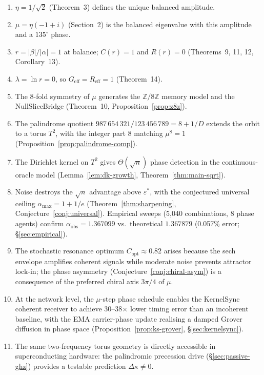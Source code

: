 \documentclass[12pt,a4paper]{article}
\theoremstyle{plain}
\theoremstyle{definition}
\theoremstyle{remark}
\newcommand{\Z}{\mathbb{Z}}
\newcommand{\abs}[1]{\lvert #1 \rvert}
\newcommand{\Geff}{G_{\mathrm{eff}}}
\newcommand{\Reff}{R_{\mathrm{eff}}}
\begin{document}
\begin{enumerate}
  \item $\eta = 1/\sqrt{2}$ (Theorem~3) defines the unique balanced amplitude.
  \item $\mu = \eta(-1+i)$ (Section~2) is the balanced eigenvalue with this
    amplitude and a $135^\circ$ phase.
  \item $r = \abs{\beta}/\abs{\alpha} = 1$ at balance; $C(r) = 1$ and $R(r)=0$
    (Theorems~9, 11, 12, Corollary~13).
  \item $\lambda = \ln r = 0$, so $\Geff=\Reff=1$ (Theorem~14).
  \item The 8-fold symmetry of $\mu$ generates the $\Z/8\Z$ memory model and
    the NullSliceBridge (Theorem~10, Proposition~\ref{prop:z8z}).
  \item The palindrome quotient $987\,654\,321/123\,456\,789 = 8 + 1/D$
    extends the orbit to a torus $T^2$, with the integer part $8$ matching
    $\mu^8=1$ (Proposition~\ref{prop:palindrome-comp}).
  \item The Dirichlet kernel on $T^2$ gives $\Theta(\sqrt{n})$ phase detection in the continuous-oracle model
    (Lemma~\ref{lem:dk-growth}, Theorem~\ref{thm:main-sqrt}).
  \item Noise destroys the $\sqrt{n}$ advantage above $\varepsilon^*$, with
    the conjectured universal ceiling $\alpha_{\max}=1+1/e$
    (Theorem~\ref{thm:sharpening}, Conjecture~\ref{conj:universal}).
    Empirical sweeps (5,040 combinations, 8 phase agents) confirm
    $\alpha_{\mathrm{obs}}=1.367099$ vs.\ theoretical $1.367879$ (0.057\%
    error; \S\ref{sec:empirical}).
  \item The stochastic resonance optimum $C_{\mathrm{opt}}\approx 0.82$
    arises because the sech envelope amplifies coherent signals while
    moderate noise prevents attractor lock-in; the phase asymmetry
    (Conjecture~\ref{conj:chiral-asym}) is a consequence of the
    preferred chiral axis $3\pi/4$ of $\mu$.
  \item At the network level, the $\mu$-step phase schedule enables the
    KernelSync coherent receiver to achieve 30--38$\times$ lower timing
    error than an incoherent baseline, with the EMA carrier-phase update
    realising a damped Grover diffusion in phase space
    (Proposition~\ref{prop:ks-grover}, \S\ref{sec:kernelsync}).
  \item The same two-frequency torus geometry is directly accessible in
    superconducting hardware: the palindromic precession drive
    (\S\ref{sec:passive-ghz}) provides a testable prediction $\Delta\kappa\ne 0$.
\end{enumerate}
\end{document}

